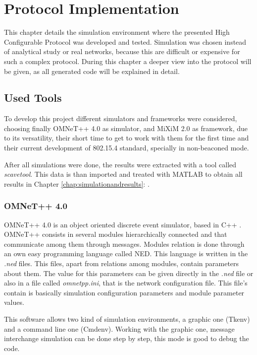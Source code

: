 \chapter{Protocol Implementation}
\label{chap:protocolimplementation}

This chapter details the simulation environment where the presented High Configurable Protocol was developed and tested. Simulation was chosen 
instead of analytical study or real networks, because this are difficult or expensive for such a complex protocol. During this chapter a 
deeper view into the protocol will be given, as all generated code will be explained in detail.

\section{Used Tools}

To develop this project different simulators and frameworks were considered, choosing finally \ac{OMNeT++} 4.0 \cite{OMNeT}
as simulator, and \ac{MiXiM} 2.0 \cite{MiXiM} as framework, due to its versatility, their short time to get to work with them for the first time and 
their current development of 802.15.4 standard, specially in non-beaconed mode.

After all simulations were done, the results were extracted with a tool called \textit{scavetool}. This data is than imported and treated with 
\ac{MATLAB} \cite{MATLAB} to obtain all results in Chapter \ref{chap:simulationandresults}: .

\subsection{\ac{OMNeT++} 4.0}

\ac{OMNeT++} 4.0 is an object oriented discrete event simulator, based in C++ \cite{cpp}. \ac{OMNeT++} consists in several modules hierarchically
connected and that communicate among them through messages. Modules relation is done through an own easy programming language called \ac{NED}.
This language is written in the \textit{.ned} files. This files, apart from relations among modules, contain parameters about them. The value for this
parameters can be given directly in the \textit{.ned} file or also in a file called \textit{omnetpp.ini}, that is the network configuration file.
This file's contain is basically simulation configuration parameters and module parameter values.

This software allows two kind of simulation environments, a graphic one (Tkenv) and a command line one (Cmdenv). Working with the graphic one, 
message interchange simulation can be done step by step, this mode is good to debug the code.

